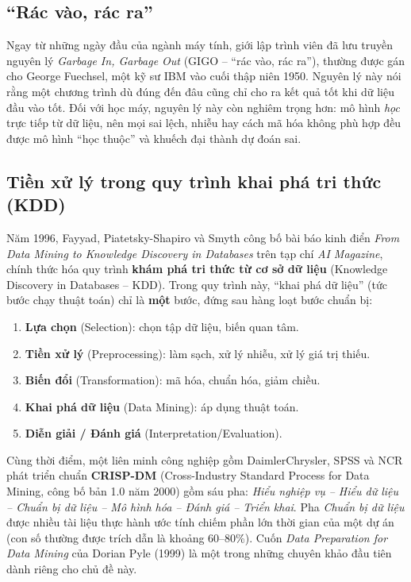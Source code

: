\subsection{``Rác vào, rác ra''}

Ngay từ những ngày đầu của ngành máy tính, giới lập trình viên đã lưu truyền nguyên lý \textit{Garbage In, Garbage Out} (GIGO -- ``rác vào, rác ra''), thường được gán cho George Fuechsel, một kỹ sư IBM vào cuối thập niên 1950. Nguyên lý này nói rằng một chương trình dù đúng đến đâu cũng chỉ cho ra kết quả tốt khi dữ liệu đầu vào tốt. Đối với học máy, nguyên lý này còn nghiêm trọng hơn: mô hình \textit{học} trực tiếp từ dữ liệu, nên mọi sai lệch, nhiễu hay cách mã hóa không phù hợp đều được mô hình ``học thuộc'' và khuếch đại thành dự đoán sai.

\subsection{Tiền xử lý trong quy trình khai phá tri thức (KDD)}

Năm 1996, Fayyad, Piatetsky-Shapiro và Smyth công bố bài báo kinh điển \textit{From Data Mining to Knowledge Discovery in Databases} trên tạp chí \textit{AI Magazine}, chính thức hóa quy trình \textbf{khám phá tri thức từ cơ sở dữ liệu} (Knowledge Discovery in Databases -- KDD). Trong quy trình này, ``khai phá dữ liệu'' (tức bước chạy thuật toán) chỉ là \textbf{một} bước, đứng sau hàng loạt bước chuẩn bị:

\begin{enumerate}
    \item \textbf{Lựa chọn} (Selection): chọn tập dữ liệu, biến quan tâm.
    \item \textbf{Tiền xử lý} (Preprocessing): làm sạch, xử lý nhiễu, xử lý giá trị thiếu.
    \item \textbf{Biến đổi} (Transformation): mã hóa, chuẩn hóa, giảm chiều.
    \item \textbf{Khai phá dữ liệu} (Data Mining): áp dụng thuật toán.
    \item \textbf{Diễn giải / Đánh giá} (Interpretation/Evaluation).
\end{enumerate}


Cùng thời điểm, một liên minh công nghiệp gồm DaimlerChrysler, SPSS và NCR phát triển chuẩn \textbf{CRISP-DM} (Cross-Industry Standard Process for Data Mining, công bố bản 1.0 năm 2000) gồm sáu pha: \textit{Hiểu nghiệp vụ -- Hiểu dữ liệu -- Chuẩn bị dữ liệu -- Mô hình hóa -- Đánh giá -- Triển khai}. Pha \textit{Chuẩn bị dữ liệu} được nhiều tài liệu thực hành ước tính chiếm phần lớn thời gian của một dự án (con số thường được trích dẫn là khoảng 60--80\%). Cuốn \textit{Data Preparation for Data Mining} của Dorian Pyle (1999) là một trong những chuyên khảo đầu tiên dành riêng cho chủ đề này.

